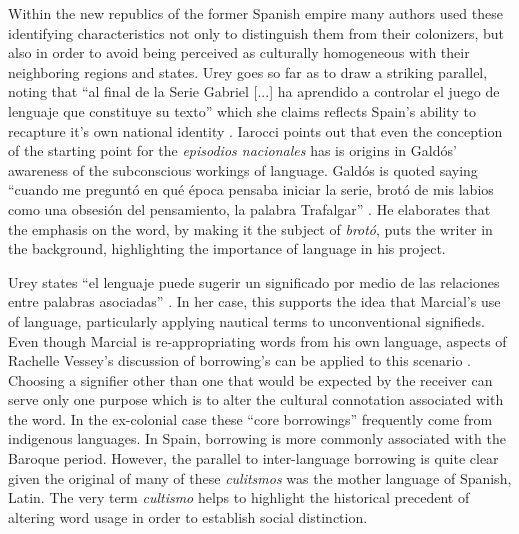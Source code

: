 \documentclass[12pt]{report}
\begin{document}
Within the new republics of the former Spanish empire many authors used these identifying characteristics not only to distinguish them from their colonizers, but also in order to avoid being perceived as culturally homogeneous with their neighboring regions and states.
Urey goes so far as to draw a striking parallel, noting that \enquote{al final de la Serie Gabriel [...] ha aprendido a controlar el juego de lenguaje que constituye su texto} which she claims reflects Spain's ability to recapture it's own national identity \cite[1532]{Urey}.
Iarocci points out that even the conception of the starting point for the \textit{episodios nacionales} has is origins in Galdós' awareness of the subconscious workings of language.
Galdós is quoted saying \enquote{cuando me preguntó en qué época pensaba iniciar la serie, brotó de mis labios como una obsesión del pensamiento, la palabra Trafalgar} \cite[184]{Iarocci2003}.
He elaborates that the emphasis on the word, by making it the subject of \textit{brotó}, puts the writer in the background, highlighting the importance of language in his project.


Urey states \enquote{el lenguaje puede sugerir un significado por medio de las relaciones entre palabras asociadas} \cite[1529]{Urey}.
In her case, this supports the idea that Marcial's use of language, particularly applying nautical terms to unconventional signifieds. 
Even though Marcial is re-appropriating words from his own language, aspects of Rachelle Vessey's discussion of borrowing's can be applied to this scenario .
Choosing a signifier other than one that would be expected by the receiver can serve only one purpose which is to alter the cultural connotation associated with the word.
In the ex-colonial case these \enquote{core borrowings} frequently come from indigenous languages.
In Spain, borrowing is more commonly associated with the Baroque period.
However, the parallel to inter-language borrowing is quite clear given the original of many of these \textit{culitsmos} was the mother language of Spanish, Latin.
The very term \textit{cultismo} helps to highlight the historical precedent of altering word usage in order to establish social distinction.
\end{document}
